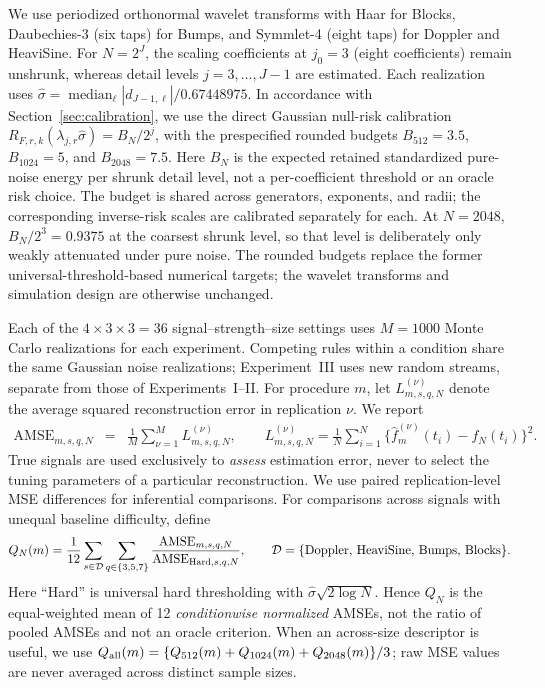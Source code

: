 We use periodized orthonormal wavelet transforms with Haar for Blocks,
Daubechies-3 (six taps) for Bumps, and Symmlet-4 (eight taps) for
Doppler and HeaviSine. For $N=2^J$, the scaling coefficients at $j_0=3$
(eight coefficients) remain unshrunk, whereas detail levels
$j=3,\ldots,J-1$ are estimated. Each realization uses
$\widehat\sigma=\operatorname{median}_{\ell}|d_{J-1,\ell}|/0.67448975$.
In accordance with Section~\ref{sec:calibration}, we use the direct
Gaussian null-risk calibration
$R_{F,r,k}(\lambda_{j,r}\widehat\sigma)=B_N/2^j$,
with the prespecified rounded budgets
$B_{512}=3.5$, $B_{1024}=5$, and $B_{2048}=7.5$. Here $B_N$ is
the expected retained standardized pure-noise energy per shrunk detail
level, not a per-coefficient threshold or an oracle risk choice. The
budget is shared across generators, exponents, and radii; the
corresponding inverse-risk scales are calibrated separately for each.
At $N=2048$, $B_N/2^3=0.9375$ at the coarsest shrunk level, so
that level is deliberately only weakly attenuated under pure noise.
The rounded budgets replace the former universal-threshold-based
numerical targets; the wavelet transforms and simulation design are
otherwise unchanged.

Each of the $4\times3\times3=36$ signal--strength--size settings uses
$M=1000$ Monte Carlo realizations for each experiment. Competing rules
within a condition share the same Gaussian noise realizations; Experiment~III
uses new random streams, separate from those of Experiments~I--II.
For procedure $m$, let $L_{m,s,q,N}^{(\nu)}$ denote the average squared
reconstruction error in replication $\nu$. We report
\begin{eqnarray}
\operatorname{AMSE}_{m,s,q,N}
 &=&\frac1M\sum_{\nu=1}^M L_{m,s,q,N}^{(\nu)},\qquad
L_{m,s,q,N}^{(\nu)}=\frac1N\sum_{i=1}^N
\{\widehat f_{m}^{(\nu)}(t_i)-f_N(t_i)\}^2.
\label{eq:simul-plan-amse}
\end{eqnarray}
True signals are used exclusively to \emph{assess} estimation error, never
to select the tuning parameters of a particular reconstruction. We use
paired replication-level MSE differences for inferential comparisons.
For comparisons across signals with unequal baseline difficulty, define
\begin{eqnarray}
Q_N(m)=\frac1{12}\sum_{s\in\mathcal D}\sum_{q\in\{3,5,7\}}
\frac{\operatorname{AMSE}_{m,s,q,N}}
{\operatorname{AMSE}_{{\rm Hard},s,q,N}},
\qquad \mathcal D=\{\text{Doppler, HeaviSine, Bumps, Blocks}\}.
\label{eq:simul-overall-score}
\end{eqnarray}
Here ``Hard'' is universal hard thresholding with
$\widehat\sigma\sqrt{2\log N}$. Hence $Q_N$ is the equal-weighted mean of
12 \emph{conditionwise normalized} AMSEs, not the ratio of pooled AMSEs
and not an oracle criterion. When an across-size descriptor is useful,
we use $Q_{\rm all}(m)=\{Q_{512}(m)+Q_{1024}(m)+Q_{2048}(m)\}/3$;
raw MSE values are never averaged across distinct sample sizes.

